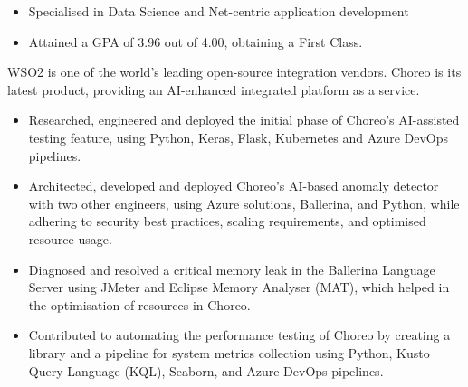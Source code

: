 \documentclass[12pt,a4paper,withhyper]{altacv}
\begin{document}
\divider{}

\begin{itemize}
    \item Specialised in Data Science and Net-centric application development
    \item Attained a GPA of 3.96 out of 4.00, obtaining a First Class.
\end{itemize}

\medskip


WSO2 is one of the world's leading open-source integration vendors. Choreo is its latest product, providing an AI-enhanced integrated platform as a service.
\medskip
\begin{itemize} 
    \item Researched, engineered and deployed the initial phase of Choreo's AI-assisted testing feature, using Python, Keras, Flask, Kubernetes and Azure DevOps pipelines.
    \item Architected, developed and deployed Choreo’s AI-based anomaly detector with two other engineers, using Azure solutions, Ballerina, and Python, while adhering to security best practices, scaling requirements, and optimised resource usage.
    \item Diagnosed and resolved a critical memory leak in the Ballerina Language Server using JMeter and Eclipse Memory Analyser (MAT), which helped in the optimisation of resources in Choreo.
    \item Contributed to automating the performance testing of Choreo by creating a library and a pipeline for system metrics collection using Python, Kusto Query Language (KQL), Seaborn, and Azure DevOps pipelines.
\end{itemize}
\end{document}
